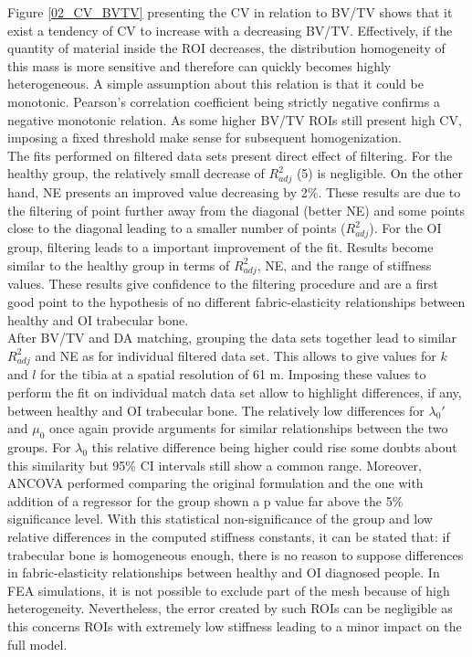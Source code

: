\documentclass[a4paper,fleqn]{DC_ArtStyle}
\begin{document}
Figure \ref{02_CV_BVTV} presenting the CV in relation to BV/TV shows that it exist a tendency of CV to increase with a decreasing BV/TV. Effectively, if the quantity of material inside the ROI decreases, the distribution homogeneity of this mass is more sensitive and therefore can quickly becomes highly heterogeneous. A simple assumption about this relation is that it could be monotonic. Pearson's correlation coefficient being strictly negative confirms a negative monotonic relation. As some higher BV/TV ROIs still present high CV, imposing a fixed threshold make sense for subsequent homogenization.\\

The fits performed on filtered data sets present direct effect of filtering. For the healthy group, the relatively small decrease of $R^2_{adj}$ (5\textperthousand) is negligible. On the other hand, NE presents an improved value decreasing by 2\%. These results are due to the filtering of point further away from the diagonal (better NE) and some points close to the diagonal leading to a smaller number of points ($R^2_{adj}$). For the OI group, filtering leads to a important improvement of the fit. Results become similar to the healthy group in terms of $R^2_{adj}$, NE, and the range of stiffness values. These results give confidence to the filtering procedure and are a first good point to the hypothesis of no different fabric-elasticity relationships between healthy and OI trabecular bone.\\

After BV/TV and DA matching, grouping the data sets together lead to similar $R^2_{adj}$ and NE as for individual filtered data set. This allows to give values for $k$ and $l$ for the tibia at a spatial resolution of 61 \si{\micro}m. Imposing these values to perform the fit on individual match data set allow to highlight differences, if any, between healthy and OI trabecular bone. The relatively low differences for $\lambda_0'$ and $\mu_0$ once again provide arguments for similar relationships between the two groups. For $\lambda_0$ this relative difference being higher could rise some doubts about this similarity but 95\% CI intervals still show a common range. Moreover, ANCOVA performed comparing the original formulation and the one with addition of a regressor for the group shown a p value far above the 5\% significance level. With this statistical non-significance of the group and low relative differences in the computed stiffness constants, it can be stated that: if trabecular bone is homogeneous enough, there is no reason to suppose differences in fabric-elasticity relationships between healthy and OI diagnosed people. In FEA simulations, it is not possible to exclude part of the mesh because of high heterogeneity. Nevertheless, the error created by such ROIs can be negligible as this concerns ROIs with extremely low stiffness leading to a minor impact on the full model.\\
\end{document}
